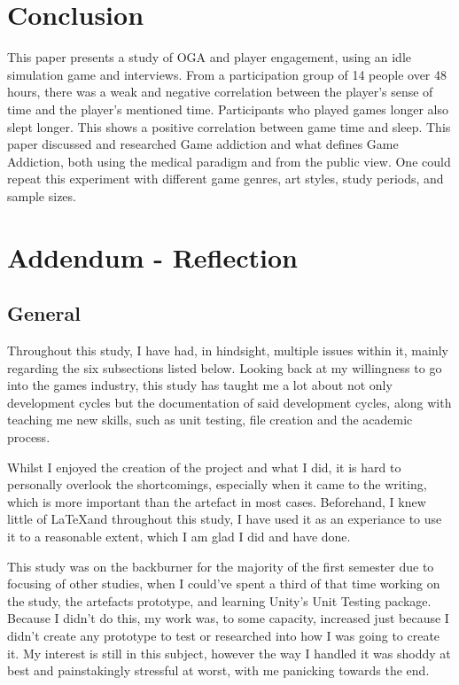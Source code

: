 \documentclass[conference]{IEEEtran}
\begin{document}
\section{Conclusion}
This paper presents a study of OGA and player engagement, using an idle simulation game and interviews. From a participation group of 14 people over 48 hours, there was a weak and negative correlation between the player’s sense of time and the player’s mentioned time. Participants who played games longer also slept longer. This shows a positive correlation between game time and sleep. This paper discussed and researched Game addiction and what defines Game Addiction, both using the medical paradigm and from the public view. One could repeat this experiment with different game genres, art styles, study periods, and sample sizes.


 
\section {Addendum - Reflection}
\subsection{General}
Throughout this study, I have had, in hindsight, multiple issues within it, mainly regarding the six subsections listed below. Looking back at my willingness to go into the games industry, this study has taught me a lot about not only development cycles but the documentation of said development cycles, along with teaching me new skills, such as unit testing, file creation and the academic process.

Whilst I enjoyed the creation of the project and what I did, it is hard to personally overlook the shortcomings, especially when it came to the writing, which is more important than the artefact in most cases. Beforehand, I knew little of \LaTeX and throughout this study, I have used it as an experiance to use it to a reasonable extent, which I am glad I did and have done.

This study was on the backburner for the majority of the first semester due to focusing of other studies, when I could've spent a third of that time working on the study, the artefacts prototype, and learning Unity's Unit Testing package. Because I didn't do this, my work was, to some capacity, increased just because I didn't create any prototype to test or researched into how I was going to create it. My interest is still in this subject, however the way I handled it was shoddy at best and painstakingly stressful at worst, with me panicking towards the end.
\end{document}
